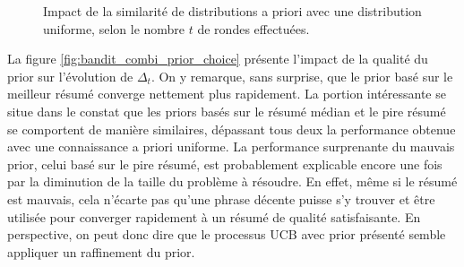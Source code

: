\begin{figure}[h!]
    \begin{center}
    \end{center}
    \caption{Impact de la similarité de distributions a priori avec une distribution uniforme, selon le nombre $t$ de rondes effectuées.}
    \label{fig:bandit_combi_prior_tau}
\end{figure}

La figure \ref{fig:bandit_combi_prior_choice} présente l'impact de la qualité du prior sur l'évolution
de $\Delta_t$.
On y remarque, sans surprise, que le prior basé sur le meilleur résumé converge nettement plus rapidement.
La portion intéressante se situe dans le constat que les priors basés sur le résumé médian et le pire résumé 
se comportent de manière similaires, dépassant tous deux la performance obtenue avec une connaissance a priori 
uniforme.
La performance surprenante du mauvais prior, celui basé sur le pire résumé, est probablement explicable 
encore une fois par la diminution de la taille du problème à résoudre.
En effet, même si le résumé est mauvais, cela n'écarte pas qu'une phrase décente puisse s'y trouver 
et être utilisée pour converger rapidement à un résumé de qualité satisfaisante.
En perspective, on peut donc dire que le processus UCB avec prior présenté semble appliquer un raffinement
du prior.

